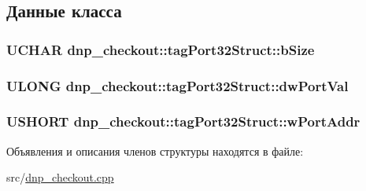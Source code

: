\subsection{Данные класса}
\hypertarget{structdnp__checkout_1_1tag_port32_struct_a7ab5c4d0cdf89b437b188e7ac604ce9f}{
\subsubsection[{b\-Size}]{\setlength{\rightskip}{0pt plus 5cm}U\-C\-H\-A\-R dnp\-\_\-checkout\-::tag\-Port32\-Struct\-::b\-Size}}\label{structdnp__checkout_1_1tag_port32_struct_a7ab5c4d0cdf89b437b188e7ac604ce9f}
\hypertarget{structdnp__checkout_1_1tag_port32_struct_a21c464a52dd63092e980b219e2b5b3be}{
\subsubsection[{dw\-Port\-Val}]{\setlength{\rightskip}{0pt plus 5cm}U\-L\-O\-N\-G dnp\-\_\-checkout\-::tag\-Port32\-Struct\-::dw\-Port\-Val}}\label{structdnp__checkout_1_1tag_port32_struct_a21c464a52dd63092e980b219e2b5b3be}
\hypertarget{structdnp__checkout_1_1tag_port32_struct_a405b7de7e55f389fa70f0b5a50b76894}{
\subsubsection[{w\-Port\-Addr}]{\setlength{\rightskip}{0pt plus 5cm}U\-S\-H\-O\-R\-T dnp\-\_\-checkout\-::tag\-Port32\-Struct\-::w\-Port\-Addr}}\label{structdnp__checkout_1_1tag_port32_struct_a405b7de7e55f389fa70f0b5a50b76894}


Объявления и описания членов структуры находятся в файле\-:\begin{DoxyCompactItemize}
\item 
src/\hyperlink{dnp__checkout_8cpp}{dnp\-\_\-checkout.\-cpp}\end{DoxyCompactItemize}
